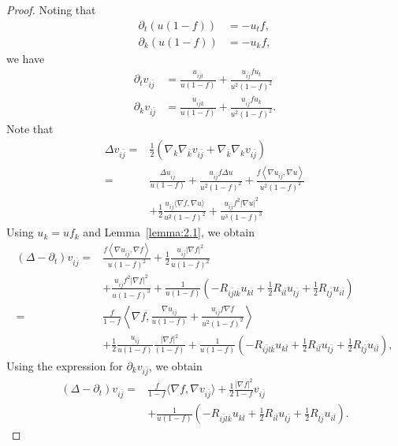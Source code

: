 \documentclass{amsart}
\theoremstyle{definition}
\theoremstyle{remark}
\numberwithin{equation}{section}
\begin{document}
\begin{proof}
    Noting that 
      \[
        \begin{aligned}
            \partial_t(u(1-f))&=-u_{t}f,\\
            \partial_k(u(1-f))&=-u_{k}f,
        \end{aligned}
      \]
    we have
      \[
        \begin{aligned}
            \partial_t v_{i\bar{j}} &=\frac{u_{i\bar{j}t}}{u(1-f)}+\frac{u_{i\bar{j}}fu_{t}}{u^{2}(1-f)^{2}}\\
            \partial_k v_{i\bar{j}}&=\frac{u_{i\bar{j}k}}{u(1-f)}+\frac{u_{i\bar{j}}fu_{k}}{u^{2}(1-f)^{2}}.
        \end{aligned}
        \]
        Note that
        \[
          \begin{aligned}
            \Delta v_{i \bar{j}}= & \frac{1}{2}\left(\nabla_k \nabla_{\bar{k}} v_{i \bar{j}}+\nabla_{\bar{k}} \nabla_k v_{i \bar{j}}\right) \\
             =&\frac{\Delta u_{i \bar{j}}}{u(1-f)}
            +\frac{u_{i \bar{j}} f \Delta u}{u^2(1-f)^2}
            +\frac{f\left\langle\nabla u_{i \bar{j}}, \nabla u\right\rangle}{u^2(1-f)^2} \\
            & +\frac{1}{2} \frac{u_{i \bar{j}}\langle\nabla f, \nabla u\rangle}{u^2(1-f)^2}+\frac{u_{i \bar{j}} f^2\left|\nabla u\right|^2}{u^3(1-f)^3}
          \end{aligned}
      \]
      Using $u_k=u f_k$ and Lemma~\ref{lemma:2.1}, we obtain
      \[
        \begin{aligned} 
           (\Delta-\partial_t) v_{i \bar{j}}
          =&\frac{f\left\langle\nabla u_{i \bar{j}}, \nabla f\right\rangle}{u(1-f)^2}+\frac{1}{2} \frac{u_{i \bar{j}}\left|\nabla f\right|^2}{u(1-f)^2} \\
          &+\frac{u_{i \bar{j}} f^2|\nabla f|^2}{u(1-f)^3}+\frac{1}{u(1-f)}\left(-R_{i \bar{j} l \bar{k}} u_{k \bar{l}}+\frac{1}{2} R_{i \bar{l}} u_{l\bar{j}}+\frac{1}{2} R_{l \bar{j}} u_{i \bar{l}}\right)\\
          =&\frac{f}{1-f}\left\langle\nabla f, \frac{\nabla u_{i \bar{j}}}{u(1-f)}+\frac{u_{i \bar{j}} f \nabla f}{u^2(1-f)^2}\right\rangle \\
          & +\frac{1}{2} \frac{u_{i \bar{j}}}{u(1-f)} \frac{\left|\nabla f \right|^2}{(1-f)}+\frac{1}{u(1-f)}\left(-R_{i \bar{j} l \bar{k}} u_{k \bar{l}}+\frac{1}{2} R_{i \bar{l}} u_{l\bar{j}}+\frac{1}{2} R_{l \bar{j}} u_{i \bar{l}}\right),
        \end{aligned}
      \]
      Using the expression for $\partial_k v_{i \bar{j}}$, we obtain
      \[
        \begin{aligned}
          (\Delta-\partial_t)v_{i \bar{j}}
          =&\frac{f}{1-f}\langle\nabla f, \nabla v_{i \bar{j}}\rangle
          +\frac{1}{2}\frac{|\nabla f|^{2}}{1-f}v_{i \bar{j}}\\
          &+\frac{1}{u(1-f)}\left(-R_{i \bar{j} l \bar{k}} u_{k \bar{l}}+\frac{1}{2} R_{i \bar{l}} u_{l\bar{j}}+\frac{1}{2} R_{l \bar{j}} u_{i \bar{l}}\right).
        \end{aligned}
      \]
\end{proof}
\end{document}
